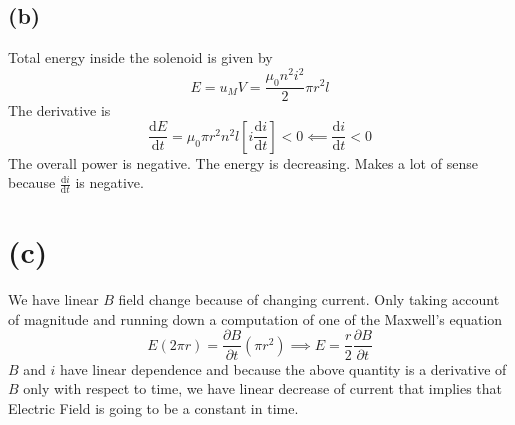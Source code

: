 \documentclass[a4paper]{article}
\begin{document}
\subsection*{(b)} 
Total energy inside the solenoid is given by 
\[
E = u_M V = \frac{\mu_0 n^2 i^2}{2} \pi r^2 l
\] 
The derivative is 
\[
\frac{\mathrm{d} E}{\mathrm{d}  t} = 
\mu_0 \pi r^2 n^2 l \left[i \frac{\mathrm{d} i}{\mathrm{d} t} \right] < 0 \impliedby \frac{\mathrm{d} i}{\mathrm{d} t} < 0 
\]
The overall power is negative. The energy is decreasing. Makes a lot of sense because $\frac{\mathrm{d} i}{\mathrm{d} t} $ is negative.  

\section*{(c)} 
We have linear $B$ field change because of changing current. Only taking account of magnitude and running down a computation of one of the Maxwell's equation
\[ E (2 \pi r) = 
\frac{\partial B}{\partial t} (\pi r^2)  \implies E = \frac{r}{2} \frac{\partial B}{\partial t}
\] 
$B$ and $i$ have linear dependence and because the above quantity is a derivative of $B$ only with respect to time, we have linear decrease of current that implies that Electric Field is going to be a constant in time. 
\end{document}
